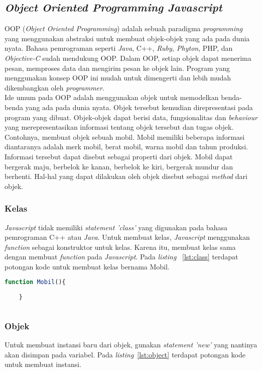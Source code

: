 \subsection{\textit{Object Oriented Programming Javascript}}
OOP (\textit{Object Oriented Programming}) adalah sebuah paradigma \textit{programming} yang menggunakan abstraksi untuk membuat objek-objek yang ada pada dunia nyata. Bahasa pemrograman seperti \textit{Java}, C++, \textit{Ruby, Phyton}, PHP, dan \textit{Objective-C} sudah mendukung OOP. Dalam OOP, setiap objek dapat menerima pesan, memproses data dan mengirim pesan ke objek lain. Program yang menggunakan konsep OOP ini mudah untuk dimengerti dan lebih mudah dikembangkan oleh \textit{programmer}. \\

Ide umum pada OOP adalah menggunakan objek untuk memodelkan benda-benda yang ada pada dunia nyata. Objek tersebut kemudian direpresentasi pada program yang dibuat. Objek-objek dapat berisi data, fungsionalitas dan \textit{behaviour} yang merepresentasikan informasi tentang objek tersebut dan tugas objek. Contohnya, membuat objek sebuah mobil. Mobil memiliki beberapa informasi diantaranya adalah merk mobil, berat mobil, warna mobil dan tahun produksi. Informasi tersebut dapat disebut sebagai properti dari objek. Mobil dapat bergerak maju, berbelok ke kanan, berbelok ke kiri, bergerak mundur dan berhenti. Hal-hal yang dapat dilakukan oleh objek disebut sebagai \textit{method} dari objek. 

\subsubsection{Kelas}
\textit{Javascript} tidak memiliki \textit{statement 'class'} yang digunakan pada bahasa pemrograman C++ atau \textit{Java}. Untuk membuat kelas, \textit{Javascript} menggunakan \textit{function} sebagai konstruktor untuk kelas. Karena itu, membuat kelas sama dengan membuat \textit{function} pada \textit{Javascript}. Pada \textit{listing} ~\ref{lst:class} terdapat potongan kode untuk membuat kelas bernama Mobil.

\begin{lstlisting}[language=Javascript, caption=Membuat kelas Mobil, label={lst:class}]
	function Mobil(){
	
	}
	
\end{lstlisting}

\subsubsection{Objek}
Untuk membuat instansi baru dari objek, gunakan \textit{statement 'new'} yang nantinya akan disimpan pada variabel. Pada \textit{listing}~\ref{lst:object} terdapat potongan kode untuk membuat instansi.

